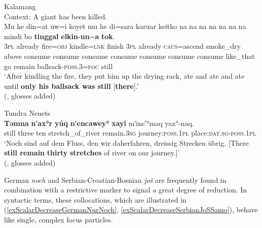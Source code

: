 \begin{exe}
	\ex Kalamang\label{exScalarDecreaseKalamangBallsack}\\
	Context: A giant has been killed.\\
	\gll Mu he din=at uw=i koyet mu he di=sara karuar keitko na na na na na na na mindi bo \textbf{tinggal} \textbf{elkin}-\textbf{un}=\textbf{a} \textbf{tok}.\\
	3\textsc{pl} already fire=\textsc{obj} kindle=\textsc{lnk} finish 3\textsc{pl} already \textsc{caus}=ascend smoke\_dry above consume consume consume consume consume consume consume like\_that go remain ballsack-\textsc{poss}.3=\textsc{foc} still\\
	\glt \lq After kindling the fire, they put him up the drying rack, ate and ate and ate until \textbf{only his ballsack was still} [\textbf{there}].'
	\\(\cite{Visser2021b},  glosses added)

	\ex Tundra Nenets\label{exScalarDecreaseTundraNenets}\\
	\gll \textbf{Təmna} \textbf{n′ax°r} \textbf{yúq} \textbf{n′encawey°} \textbf{xayi} m′inc′°maq yax°-naq.\\
	still three ten stretch\_of\_river remain.3\textsc{sg} journey:\textsc{poss}.1\textsc{pl} place:\textsc{dat}.\textsc{sg}-\textsc{poss}.1\textsc{pl}\\
	\glt \lq{}Noch sind auf dem Fluss, den wir daherfahren, dreissig Strecken übrig. [There \textbf{still remain} \textbf{thirty} \textbf{stretches} of river on our journey.]\rq
	\\(\cite[319]{Lehtisalo1956},  glosses added) 
\end{exe}

German \textit{noch} and Serbian-Croatian-Bosnian \textit{još} are frequently found in combination with a restrictive marker to signal a great degree of reduction. In syntactic terms, these collocations, which are illustrated in (\ref{exScalarDecreaseGermanNurNoch}, \ref{exScalarDecreaseSerbianJoSSamo}), behave like single, complex focus particles.

